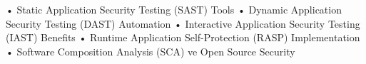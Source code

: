 • Static Application Security Testing (SAST) Tools
• Dynamic Application Security Testing (DAST) Automation
• Interactive Application Security Testing (IAST) Benefits
• Runtime Application Self-Protection (RASP) Implementation
• Software Composition Analysis (SCA) ve Open Source Security